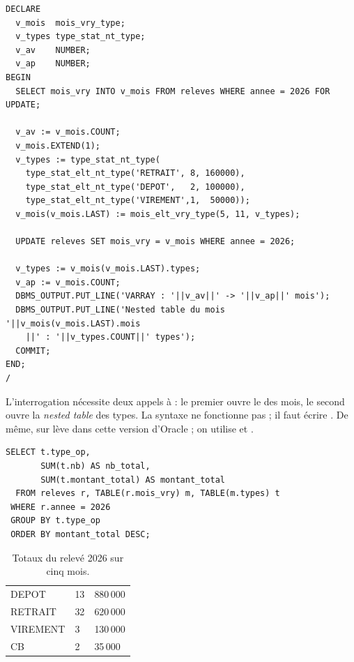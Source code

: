 \begin{lstlisting}[caption={E11 : extension à un cinquième mois.},label={lst:e11-extend}]
DECLARE
  v_mois  mois_vry_type;
  v_types type_stat_nt_type;
  v_av    NUMBER;
  v_ap    NUMBER;
BEGIN
  SELECT mois_vry INTO v_mois FROM releves WHERE annee = 2026 FOR UPDATE;

  v_av := v_mois.COUNT;
  v_mois.EXTEND(1);
  v_types := type_stat_nt_type(
    type_stat_elt_nt_type('RETRAIT', 8, 160000),
    type_stat_elt_nt_type('DEPOT',   2, 100000),
    type_stat_elt_nt_type('VIREMENT',1,  50000));
  v_mois(v_mois.LAST) := mois_elt_vry_type(5, 11, v_types);

  UPDATE releves SET mois_vry = v_mois WHERE annee = 2026;

  v_types := v_mois(v_mois.LAST).types;
  v_ap := v_mois.COUNT;
  DBMS_OUTPUT.PUT_LINE('VARRAY : '||v_av||' -> '||v_ap||' mois');
  DBMS_OUTPUT.PUT_LINE('Nested table du mois '||v_mois(v_mois.LAST).mois
    ||' : '||v_types.COUNT||' types');
  COMMIT;
END;
/
\end{lstlisting}

L'interrogation nécessite deux appels à  : le premier ouvre le
 des mois, le second ouvre la \emph{nested table} des types. La
syntaxe  ne fonctionne pas ; il faut écrire
. De même,  sur  lève
 dans cette version d'Oracle ; on utilise  et
.

\begin{lstlisting}[caption={E11 : total annuel par type d'opération.},label={lst:e11-total}]
SELECT t.type_op,
       SUM(t.nb) AS nb_total,
       SUM(t.montant_total) AS montant_total
  FROM releves r, TABLE(r.mois_vry) m, TABLE(m.types) t
 WHERE r.annee = 2026
 GROUP BY t.type_op
 ORDER BY montant_total DESC;
\end{lstlisting}

\begin{table}[htbp]
  \centering
  \small
  \caption{Totaux du relevé 2026 sur cinq mois.}
  \label{tab:resultats-e11}
  \begin{tabularx}{0.62\textwidth}{@{}L{3.4cm}C{2.6cm}C{3.2cm}@{}}
    \toprule
     &  &  \\
    \midrule
    DEPOT & 13 & 880\,000 \\
    RETRAIT & 32 & 620\,000 \\
    VIREMENT & 3 & 130\,000 \\
    CB & 2 & 35\,000 \\
    \bottomrule
  \end{tabularx}
\end{table}


